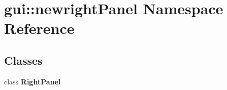 \section{gui::newrightPanel Namespace Reference}
\label{namespacegui_1_1newrightPanel}


\subsection*{Classes}
\begin{CompactItemize}
\item 
class {\bf RightPanel}
\end{CompactItemize}
